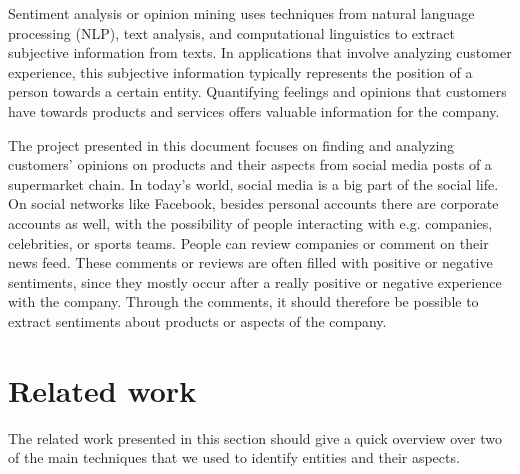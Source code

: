 \documentclass[10pt,a4paper]{article}
\begin{document}
	Sentiment analysis or opinion mining uses techniques from natural language processing (NLP), text analysis, and computational linguistics to extract subjective information from texts. In applications that involve analyzing customer experience, this subjective information typically represents the position of a person towards a certain entity. Quantifying feelings and opinions that customers have towards products and services offers valuable information for the company.
	
	
	The project presented in this document focuses on finding and analyzing customers' opinions on products and their aspects from social media posts of a supermarket chain. In today's world, social media is a big part of the social life. On social networks like Facebook, besides personal accounts there are corporate accounts as well, with the possibility of people interacting with e.g. companies, celebrities, or sports teams. People can review companies or comment on their news feed. These comments or reviews are often filled with positive or negative sentiments, since they mostly occur after a really positive or negative experience with the company. Through the comments, it should therefore be possible to extract sentiments about products or aspects of the company.
		
	\section{Related work}
	The related work presented in this section should give a quick overview over two of the main techniques that we used to identify entities and their aspects.
		
\end{document}
